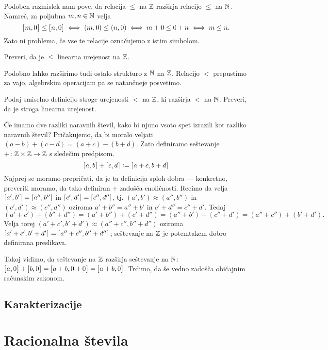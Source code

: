 Podoben razmislek nam pove, da relacija $\leq$ na $\mathbb{Z}$ razširja relacijo $\leq$ na $\mathbb{N}$. Namreč, za poljubna $m, n \in \mathbb{N}$ velja
\[[\:\!{m, 0}\:\!]_{} \leq [\:\!{n, 0}\:\!]_{} \iff (m, 0) \leq (n, 0) \iff m + 0 \leq 0 + n \iff m \leq n.\]
Zato ni problema, če vse te relacije označujemo z istim simbolom.

\begin{naloga}
Preveri, da je $\leq$ linearna urejenost na $\mathbb{Z}$.
\end{naloga}

Podobno lahko razširimo tudi ostalo strukturo z $\mathbb{N}$ na $\mathbb{Z}$. Relacijo $<$ prepustimo za vajo, algebrskim operacijam pa se natančneje posvetimo.

\begin{naloga}
Podaj smiselno definicijo stroge urejenosti $<$ na $\mathbb{Z}$, ki razširja $<$ na $\mathbb{N}$. Preveri, da je stroga linearna urejenost.
\end{naloga}

Če imamo dve razliki naravnih števil, kako bi njuno vsoto spet izrazili kot razliko naravnih števil? Pričakujemo, da bi moralo veljati $(a - b) + (c - d) = (a + c) - (b + d)$. Zato definiramo seštevanje $+\colon \mathbb{Z} \times \mathbb{Z} \to \mathbb{Z}$ s sledečim predpisom.
\[[\:\!{a, b}\:\!]_{} + [\:\!{c, d}\:\!]_{} \mathrel{\mathop:}= [\:\!{a + c, b + d}\:\!]_{}\]
Najprej se moramo prepričati, da je ta definicija sploh dobra --- konkretno, preveriti moramo, da tako definiran $+$ zadošča enoličnosti. Recimo da velja $[\:\!{a', b'}\:\!]_{} = [\:\!{a'', b''}\:\!]_{}$ in $[\:\!{c', d'}\:\!]_{} = [\:\!{c'', d''}\:\!]_{}$, tj. $(a', b') \approx (a'' , b'')$ in $(c', d') \approx (c'', d'')$ oziroma $a' + b'' = a'' + b'$ in $c' + d'' = c'' + d'$. Tedaj
\[(a' + c') + (b'' + d'') = (a' + b'') + (c' + d'') = (a'' + b') + (c'' + d') = (a'' + c'') + (b' + d').\]
Velja torej $(a' + c', b' + d') \approx (a'' + c'', b'' + d'')$ oziroma $[\:\!{a' + c', b' + d'}\:\!]_{} = [\:\!{a'' + c'', b'' + d''}\:\!]_{}$; seštevanje na $\mathbb{Z}$ je potemtakem dobro definirana preslikava.

Takoj vidimo, da seštevanje na $\mathbb{Z}$ razširja seštevanje na $\mathbb{N}$: $\ec{a, 0} + \ec{b, 0} = \ec{a + b, 0 + 0} = \ec{a + b, 0}$. Trdimo, da še vedno zadošča običajnim računskim zakonom.


\subsection{Karakterizacije}


\section{Racionalna števila}
